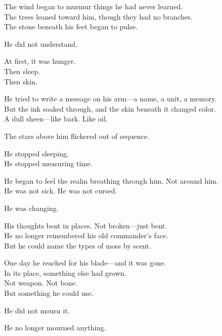 \documentclass[9pt]{article}
\begin{document}
\vspace{0.5em}
The wind began to murmur things he had never learned.\\
The trees leaned toward him, though they had no branches.\\
The stone beneath his feet began to pulse.

\vspace{0.5em}
He did not understand.

\vspace{0.5em}
At first, it was hunger.\\
Then sleep.\\
Then skin.

\vspace{0.5em}
He tried to write a message on his arm---a name, a unit, a memory.\\
But the ink soaked through, and the skin beneath it changed color.\\
A dull sheen---like bark. Like oil.

\vspace{0.5em}
The stars above him flickered out of sequence.

\vspace{0.5em}
He stopped sleeping.\\
He stopped measuring time.

\vspace{0.5em}
He began to feel the realm breathing through him. Not around him.\\
He was not sick. He was not cursed.

\vspace{0.5em}
He was changing.

\vspace{0.5em}
His thoughts bent in places. Not broken---just bent.\\
He no longer remembered his old commander’s face.\\
But he could name the types of moss by scent.

\vspace{0.5em}
One day he reached for his blade---and it was gone.\\
In its place, something else had grown.\\
Not weapon. Not bone.\\
But something he could use.

\vspace{0.5em}
He did not mourn it.

\vspace{0.5em}
He no longer mourned anything.
\end{document}
